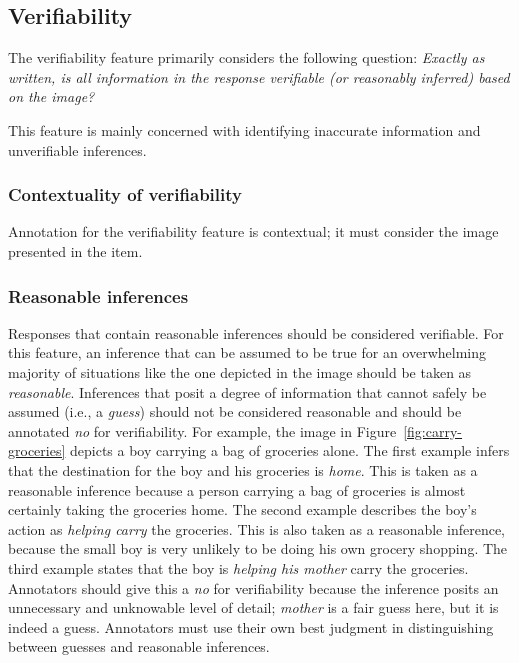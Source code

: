 \documentclass[12pt,notitlepage]{article}
\begin{document}
\subsection{Verifiability} \label{subsec:verifiability}

The verifiability feature primarily considers the following question: \textit{Exactly as written, is all information in the response verifiable (or reasonably inferred) based on the image?}

This feature is mainly concerned with identifying inaccurate information and unverifiable inferences. 

\subsubsection{Contextuality of verifiability} Annotation for the verifiability feature is contextual; it must consider the image presented in the item. 

\subsubsection{Reasonable inferences} Responses that contain reasonable inferences should be considered verifiable. For this feature, an inference that can be assumed to be true for an overwhelming majority of situations like the one depicted in the image should be taken as \textit{reasonable}. Inferences that posit a degree of information that cannot safely be assumed (i.e., a \textit{guess}) should not be considered reasonable and should be annotated \textit{no} for verifiability. For example, the image in Figure~\ref{fig:carry-groceries} depicts a boy carrying a bag of groceries alone. The first example infers that the destination for the boy and his groceries is \textit{home}. This is taken as a reasonable inference because a person carrying a bag of groceries is almost certainly taking the groceries home. The second example describes the boy's action as \textit{helping carry} the groceries. This is also taken as a reasonable inference, because the small boy is very unlikely to be doing his own grocery shopping. The third example states that the boy is \textit{helping his mother} carry the groceries. Annotators should give this a \textit{no} for verifiability because the inference posits an unnecessary and unknowable level of detail; \textit{mother} is a fair guess here, but it is indeed a guess. Annotators must use their own best judgment in distinguishing between guesses and reasonable inferences.
\end{document}
